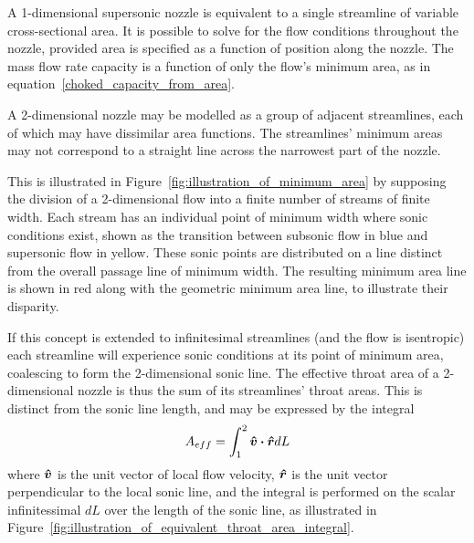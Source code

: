 \documentclass[a4paper, 11pt, twoside]{report}
\begin{document}


A 1-dimensional supersonic nozzle is equivalent to a single streamline of variable cross-sectional area. It is possible to solve for the flow conditions throughout the nozzle, provided area is specified as a function of position along the nozzle. The mass flow rate capacity is a function of only the flow's minimum area, as in equation~\ref{choked_capacity_from_area}.

A 2-dimensional nozzle may be modelled as a group of adjacent streamlines, each of which may have dissimilar area functions. The streamlines' minimum areas may not correspond to a straight line across the narrowest part of the nozzle. 

This is illustrated in Figure~\ref{fig:illustration_of_minimum_area} by supposing the division of a 2-dimensional flow into a finite number of streams of finite width. Each stream has an individual point of minimum width where sonic conditions exist, shown as the transition between subsonic flow in blue and supersonic flow in yellow. These sonic points are distributed on a line distinct from the overall passage line of minimum width. The resulting minimum area line is shown in red along with the geometric minimum area line, to illustrate their disparity.

If this concept is extended to infinitesimal streamlines (and the flow is isentropic) each streamline will experience sonic conditions at its point of minimum area, coalescing to form the 2-dimensional sonic line. The effective throat area of a 2-dimensional nozzle is thus the sum of its streamlines' throat areas. This is distinct from the sonic line length, and may be expressed by the integral
\begin{equation}\label{effective_throat_area_integral}
	A_{eff} = 
	\int_{1}^2 \vu*{v} \vdot \vu*{r} dL
\end{equation}
where $\vu*{v}$ is the unit vector of local flow velocity, $\vu*{r}$ is the unit vector perpendicular to the local sonic line, and the integral is performed on the scalar infinitessimal $dL$ over the length of the sonic line, as illustrated in Figure~\ref{fig:illustration_of_equivalent_throat_area_integral}.
 		
\end{document}
